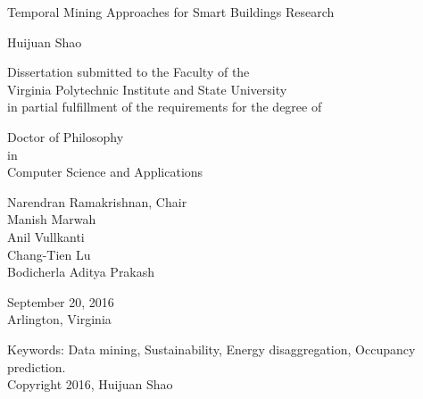\documentclass[12pt,pdf]{report}
\begin{document}
\thispagestyle{empty}
\begin{center}

{\Large 
Temporal Mining Approaches for Smart Buildings Research
}

\vfill

Huijuan Shao

\vfill

Dissertation submitted to the Faculty of the \\
Virginia Polytechnic Institute and State University \\
in partial fulfillment of the requirements for the degree of

\vfill

Doctor of Philosophy \\
in \\
Computer Science and Applications

\vfill

Narendran Ramakrishnan, Chair \\
Manish Marwah \\
Anil Vullkanti \\
Chang-Tien Lu \\
Bodicherla Aditya Prakash \\

\vfill

September 20, 2016 \\
Arlington, Virginia

\vfill

Keywords: Data mining, Sustainability, Energy disaggregation, Occupancy prediction. 
\\
Copyright 2016, Huijuan Shao

\end{center}
\end{document}
